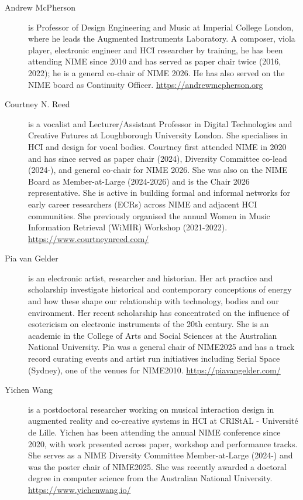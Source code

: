 \documentclass[acmsmall]{nimeart}
\begin{document}
\begin{description}
\item[Andrew McPherson] is Professor of Design Engineering and Music at Imperial College London, where he leads the Augmented Instruments Laboratory. A composer, viola player, electronic engineer and HCI researcher by training, he has been attending NIME since 2010 and has served as paper chair twice (2016, 2022); he is a general co-chair of NIME 2026. He has also served on the NIME board as Continuity Officer. \url{https://andrewmcpherson.org}

\item[Courtney N. Reed] is a vocalist and Lecturer/Assistant Professor in Digital Technologies and Creative Futures at Loughborough University London. She specialises in HCI and design for vocal bodies. Courtney first attended NIME in 2020 and has since served as paper chair (2024), Diversity Committee co-lead (2024-), and general co-chair for NIME 2026. She was also on the NIME Board as Member-at-Large (2024-2026) and is the Chair 2026 representative. She is active in building formal and informal networks for early career researchers (ECRs) across NIME and adjacent HCI communities. She previously organised the annual Women in Music Information Retrieval (WiMIR) Workshop (2021-2022). \url{https://www.courtneynreed.com/}

\item[Pia van Gelder] is an electronic artist, researcher and historian. Her art practice and scholarship
investigate historical and contemporary conceptions of energy and how these shape our relationship
with technology, bodies and our environment. Her recent scholarship has concentrated on the influence
of esotericism on electronic instruments of the 20th century. She is an academic in the College of Arts and
Social Sciences at the Australian National University. Pia was a general chair of NIME2025 and has a track record curating events and artist run initiatives including Serial Space (Sydney), one of the venues for NIME2010. \url{https://piavangelder.com/}

\item[Yichen Wang] is a postdoctoral researcher working on musical interaction design in augmented reality and co-creative systems in HCI at CRIStAL - Universit{é} de Lille. Yichen has been attending the annual NIME conference since 2020, with work presented across paper, workshop and performance tracks. She serves as a NIME Diversity Committee Member-at-Large (2024-) and was the poster chair of NIME2025. She was recently awarded a doctoral degree in computer science from the Australian National University. \url{https://www.yichenwang.io/}


\end{description}
\end{document}
